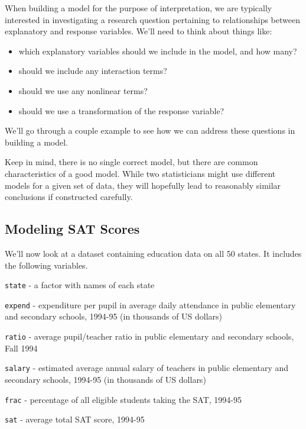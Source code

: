 \documentclass[
  letterpaper,
  DIV=11,
  numbers=noendperiod]{scrreprt}
\providecommand{\tightlist}{%
  \setlength{\itemsep}{0pt}\setlength{\parskip}{0pt}}\usepackage{longtable,booktabs,array}
\begin{document}
When building a model for the purpose of interpretation, we are
typically interested in investigating a research question pertaining to
relationships between explanatory and response variables. We'll need to
think about things like:

\begin{itemize}
\tightlist
\item
  which explanatory variables should we include in the model, and how
  many?\\
\item
  should we include any interaction terms?\\
\item
  should we use any nonlinear terms?\\
\item
  should we use a transformation of the response variable?
\end{itemize}

We'll go through a couple example to see how we can address these
questions in building a model.

Keep in mind, there is no single correct model, but there are common
characteristics of a good model. While two statisticians might use
different models for a given set of data, they will hopefully lead to
reasonably similar conclusions if constructed carefully.

\subsection{Modeling SAT Scores}\label{modeling-sat-scores}

We'll now look at a dataset containing education data on all 50 states.
It includes the following variables.

\texttt{state} - a factor with names of each state

\texttt{expend} - expenditure per pupil in average daily attendance in
public elementary and secondary schools, 1994-95 (in thousands of US
dollars)

\texttt{ratio} - average pupil/teacher ratio in public elementary and
secondary schools, Fall 1994

\texttt{salary} - estimated average annual salary of teachers in public
elementary and secondary schools, 1994-95 (in thousands of US dollars)

\texttt{frac} - percentage of all eligible students taking the SAT,
1994-95

\texttt{sat} - average total SAT score, 1994-95
\end{document}
